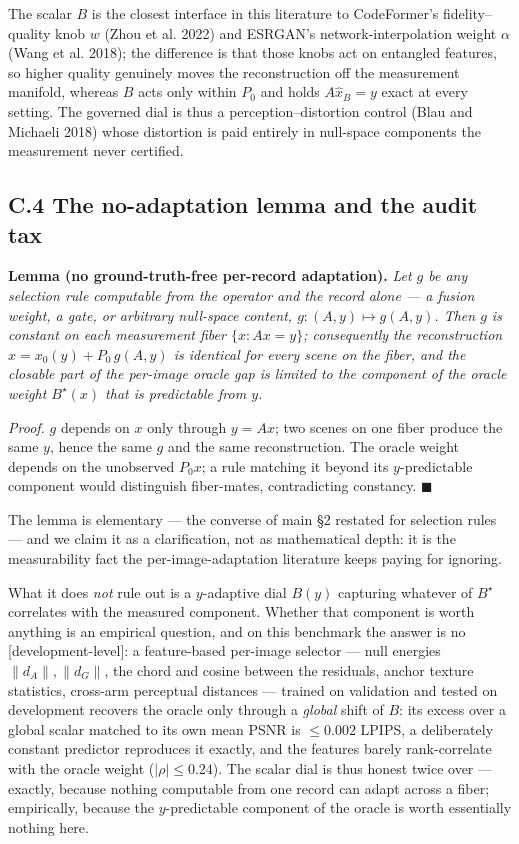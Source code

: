\documentclass[11pt]{article}
\begin{document}
The scalar $B$ is the closest interface in this literature to CodeFormer's fidelity--quality knob $w$ (Zhou et al. 2022) and ESRGAN's network-interpolation weight $\alpha$ (Wang et al. 2018); the difference is that those knobs act on entangled features, so higher quality genuinely moves the reconstruction off the measurement manifold, whereas $B$ acts only within $P_0$ and holds $A\hat{x}_B = y$ exact at every setting. The governed dial is thus a perception--distortion control (Blau and Michaeli 2018) whose distortion is paid entirely in null-space components the measurement never certified.

\subsection*{C.4 The no-adaptation lemma and the audit tax}

\textbf{Lemma (no ground-truth-free per-record adaptation).} \textit{Let $g$ be any selection rule computable from the operator and the record alone --- a fusion weight, a gate, or arbitrary null-space content, $g:(A, y) \mapsto g(A,y)$. Then $g$ is constant on each measurement fiber $\{x : Ax = y\}$; consequently the reconstruction $\hat{x} = x_0(y) + P_0\, g(A,y)$ is identical for every scene on the fiber, and the closable part of the per-image oracle gap is limited to the component of the oracle weight $B^\star(x)$ that is predictable from $y$.}

\textit{Proof.} $g$ depends on $x$ only through $y = Ax$; two scenes on one fiber produce the same $y$, hence the same $g$ and the same reconstruction. The oracle weight depends on the unobserved $P_0 x$; a rule matching it beyond its $y$-predictable component would distinguish fiber-mates, contradicting constancy. $\blacksquare$

The lemma is elementary --- the converse of main §2 restated for selection rules --- and we claim it as a clarification, not as mathematical depth: it is the measurability fact the per-image-adaptation literature keeps paying for ignoring.

What it does \textit{not} rule out is a $y$-adaptive dial $B(y)$ capturing whatever of $B^\star$ correlates with the measured component. Whether that component is worth anything is an empirical question, and on this benchmark the answer is no [development-level]: a feature-based per-image selector --- null energies $\|d_A\|, \|d_G\|$, the chord and cosine between the residuals, anchor texture statistics, cross-arm perceptual distances --- trained on validation and tested on development recovers the oracle only through a \textit{global} shift of $B$: its excess over a global scalar matched to its own mean PSNR is $\le 0.002$ LPIPS, a deliberately constant predictor reproduces it exactly, and the features barely rank-correlate with the oracle weight ($|\rho| \le 0.24$). The scalar dial is thus honest twice over --- exactly, because nothing computable from one record can adapt across a fiber; empirically, because the $y$-predictable component of the oracle is worth essentially nothing here.
\end{document}
